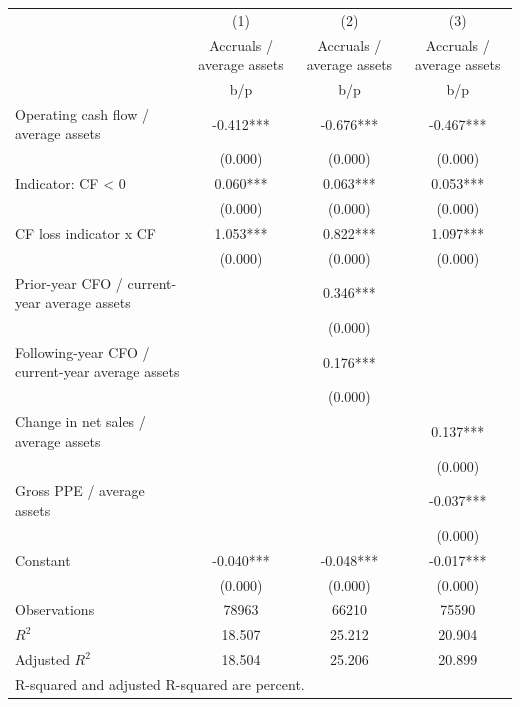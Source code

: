 {
\def\sym#1{\ifmmode^{#1}\else\(^{#1}\)\fi}
\begin{tabular}{l*{3}{c}}
\hline\hline
                    &\multicolumn{1}{c}{(1)}&\multicolumn{1}{c}{(2)}&\multicolumn{1}{c}{(3)}\\
                    &\multicolumn{1}{c}{Accruals / average assets}&\multicolumn{1}{c}{Accruals / average assets}&\multicolumn{1}{c}{Accruals / average assets}\\
                    &         b/p   &         b/p   &         b/p   \\
\hline
Operating cash flow / average assets&      -0.412***&      -0.676***&      -0.467***\\
                    &     (0.000)   &     (0.000)   &     (0.000)   \\
Indicator: CF < 0   &       0.060***&       0.063***&       0.053***\\
                    &     (0.000)   &     (0.000)   &     (0.000)   \\
CF loss indicator x CF&       1.053***&       0.822***&       1.097***\\
                    &     (0.000)   &     (0.000)   &     (0.000)   \\
Prior-year CFO / current-year average assets&               &       0.346***&               \\
                    &               &     (0.000)   &               \\
Following-year CFO / current-year average assets&               &       0.176***&               \\
                    &               &     (0.000)   &               \\
Change in net sales / average assets&               &               &       0.137***\\
                    &               &               &     (0.000)   \\
Gross PPE / average assets&               &               &      -0.037***\\
                    &               &               &     (0.000)   \\
Constant            &      -0.040***&      -0.048***&      -0.017***\\
                    &     (0.000)   &     (0.000)   &     (0.000)   \\
\hline
Observations        &       78963   &       66210   &       75590   \\
\(R^{2}\)           &      18.507   &      25.212   &      20.904   \\
Adjusted \(R^{2}\)  &      18.504   &      25.206   &      20.899   \\
\hline\hline
\multicolumn{4}{l}{\footnotesize R-squared and adjusted R-squared are percent.}\\
\end{tabular}
}

